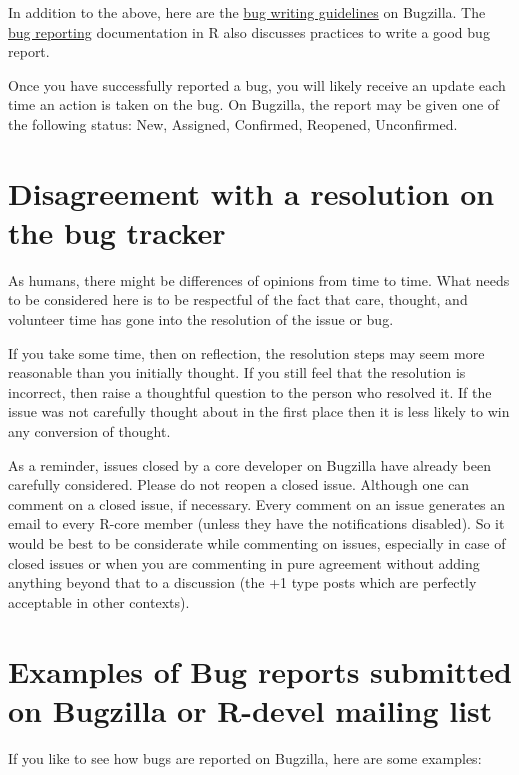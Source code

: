 \documentclass[
]{book}
\begin{document}
In addition to the above, here are the \href{https://bugs.r-project.org/bugzilla/page.cgi?id=bug-writing.html}{bug writing guidelines} on Bugzilla. The \href{https://www.r-project.org/bugs.html\#writing-a-good-bug-report}{bug reporting} documentation in R also discusses practices to write a good bug report.

Once you have successfully reported a bug, you will likely receive an update each time an action is taken on the bug. On Bugzilla, the report may be given one of the following status: New, Assigned, Confirmed, Reopened, Unconfirmed.

\section{Disagreement with a resolution on the bug tracker}\label{disagreement-with-a-resolution-on-the-bug-tracker}

As humans, there might be differences of opinions from time to time. What needs to be considered here is to be respectful of the fact that care, thought, and volunteer time has gone into the resolution of the issue or bug.

If you take some time, then on reflection, the resolution steps may seem more reasonable than you initially thought. If you still feel that the resolution is incorrect, then raise a thoughtful question to the person who resolved it. If the issue was not carefully thought about in the first place then it is less likely to win any conversion of thought.

As a reminder, issues closed by a core developer on Bugzilla have already been carefully considered. Please do not reopen a closed issue. Although one can comment on a closed issue, if necessary. Every comment on an issue generates an email to every R-core member (unless they have the notifications disabled). So it would be best to be considerate while commenting on issues, especially in case of closed issues or when you are commenting in pure agreement without adding anything beyond that to a discussion (the +1 type posts which are perfectly acceptable in other contexts).

\section{Examples of Bug reports submitted on Bugzilla or R-devel mailing list}\label{examples-of-bug-reports-submitted-on-bugzilla-or-r-devel-mailing-list}

If you like to see how bugs are reported on Bugzilla, here are some examples:
\end{document}
